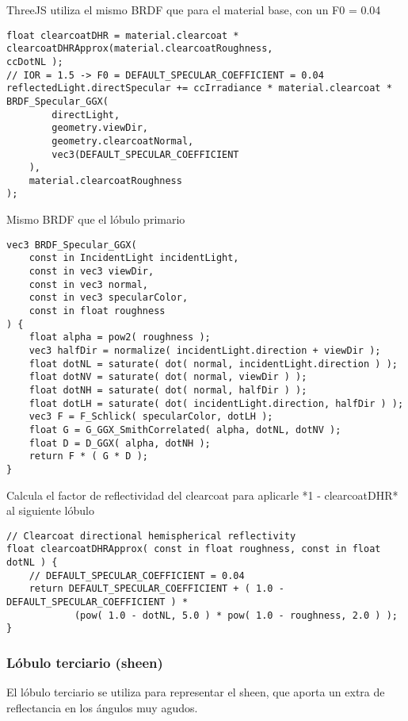             ThreeJS utiliza el mismo BRDF que para el material base, con un F0 = 0.04
            \singlespacing
            \begin{lstlisting}[caption=My Javascript Example]
float clearcoatDHR = material.clearcoat * clearcoatDHRApprox(material.clearcoatRoughness,                      ccDotNL );
// IOR = 1.5 -> F0 = DEFAULT_SPECULAR_COEFFICIENT = 0.04
reflectedLight.directSpecular += ccIrradiance * material.clearcoat * BRDF_Specular_GGX(
        directLight,
        geometry.viewDir,
        geometry.clearcoatNormal,
        vec3(DEFAULT_SPECULAR_COEFFICIENT
    ),
    material.clearcoatRoughness
);
            \end{lstlisting}
            \singlespacing
            Mismo BRDF que el lóbulo primario
            \singlespacing
            \begin{lstlisting}[caption=My Javascript Example]
vec3 BRDF_Specular_GGX(
    const in IncidentLight incidentLight,
    const in vec3 viewDir,
    const in vec3 normal,
    const in vec3 specularColor,
    const in float roughness
) {
    float alpha = pow2( roughness );
    vec3 halfDir = normalize( incidentLight.direction + viewDir );
    float dotNL = saturate( dot( normal, incidentLight.direction ) );
    float dotNV = saturate( dot( normal, viewDir ) );
    float dotNH = saturate( dot( normal, halfDir ) );
    float dotLH = saturate( dot( incidentLight.direction, halfDir ) );
    vec3 F = F_Schlick( specularColor, dotLH );
    float G = G_GGX_SmithCorrelated( alpha, dotNL, dotNV );
    float D = D_GGX( alpha, dotNH );
    return F * ( G * D );
}
            \end{lstlisting}
            \singlespacing
            Calcula el factor de reflectividad del clearcoat para aplicarle *1 - clearcoatDHR* al
            siguiente lóbulo
            \singlespacing
            \begin{lstlisting}[caption=My Javascript Example]
// Clearcoat directional hemispherical reflectivity
float clearcoatDHRApprox( const in float roughness, const in float dotNL ) {
    // DEFAULT_SPECULAR_COEFFICIENT = 0.04
    return DEFAULT_SPECULAR_COEFFICIENT + ( 1.0 - DEFAULT_SPECULAR_COEFFICIENT ) *
            (pow( 1.0 - dotNL, 5.0 ) * pow( 1.0 - roughness, 2.0 ) );
}
            \end{lstlisting}
            \singlespacing

        \subsubsection{L\'obulo terciario (sheen)}
            El l\'obulo terciario se utiliza para representar el sheen, que aporta un extra de
            reflectancia en los \'angulos muy agudos.

